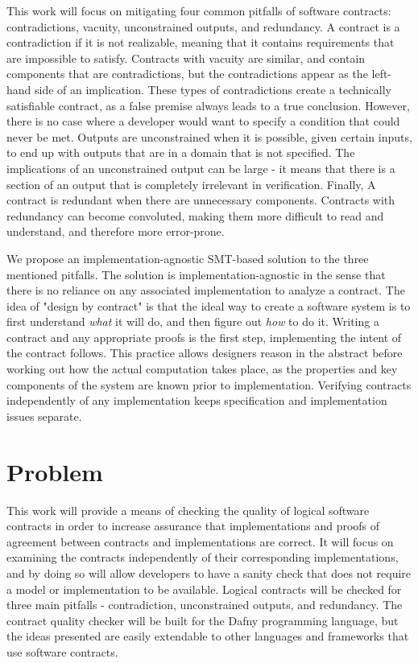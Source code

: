 \documentclass{article}
\begin{document}
This work will focus on mitigating four common pitfalls of software contracts: contradictions, vacuity, unconstrained
outputs, and redundancy. A contract is a contradiction if it is not realizable, meaning that it 
contains requirements that are impossible to satisfy. Contracts with vacuity are similar, and contain components that are contradictions, 
but the contradictions appear as the left-hand side of an implication. These types of contradictions create a technically satisfiable contract, as 
a false premise always leads to a true conclusion. However, there is no case where a developer would want to specify a condition that could 
never be met. Outputs are unconstrained when it is possible, given certain inputs, to end up with outputs that are in a domain that is not specified.
The implications of an unconstrained output can be large - it means that there is a section of an output that is
completely irrelevant in verification. Finally, A contract is redundant when there are unnecessary components. Contracts
with redundancy can become convoluted, making them more difficult to read and understand, and therefore more
error-prone.

We propose an implementation-agnostic SMT-based solution to the three mentioned pitfalls. The solution is implementation-agnostic in the sense
that there is no reliance on any associated implementation to analyze a contract. The idea of "design by contract" \cite{meyer1992applying} is that the 
ideal way to create a software system is to first understand {\it what} it will do, and then figure out {\it how} to do it. Writing a contract and 
any appropriate proofs is the first step, implementing the intent of the contract follows. This practice allows designers reason in the abstract 
before working out how the actual computation takes place, as the properties and key components of the system are known prior to implementation. 
Verifying contracts independently of any implementation keeps specification and implementation issues separate. 

\section{Problem}

This work will provide a means of checking the quality of logical software contracts in order to increase assurance
that implementations and proofs of agreement between contracts and implementations are correct. It will focus on
examining the contracts independently of their corresponding implementations, and by doing so will allow developers
to have a sanity check that does not require a model or implementation to be available. Logical contracts will be
checked for three main pitfalls - contradiction, unconstrained outputs, and redundancy. The contract quality checker
will be built for the Dafny programming language, but the ideas presented are easily extendable to other languages
and frameworks that use software contracts. 
\end{document}
